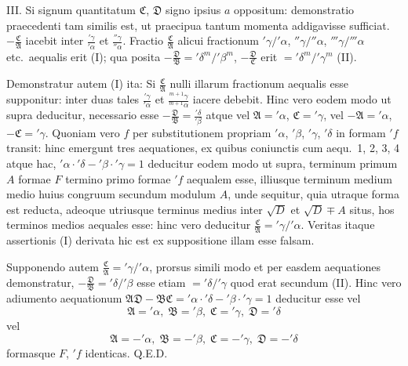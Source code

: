 \documentclass[12pt,a4paper]{article}
\theoremstyle{plain}
\begin{document}
III. Si signum quantitatum $\mathfrak{C}$, $\mathfrak{D}$ signo ipsius $a$ oppositum: demonstratio praecedenti tam similis est, ut praecipua tantum momenta addigavisse sufficiat. $-\frac{\mathfrak{C}}{\mathfrak{A}}$ iacebit inter $\frac{'\gamma}{'\alpha}$ et $\frac{''\gamma}{''\alpha}$. Fractio $\frac{\mathfrak{C}}{\mathfrak{A}}$ alicui fractionum $'\gamma/'\alpha$, $''\gamma/''\alpha$, $'''\gamma/'''\alpha$ etc.~aequalis erit (I); qua posita $-\frac{\mathfrak{D}}{\mathfrak{B}} = '\delta^m/'\beta^m$, $-\frac{\mathfrak{D}}{\mathfrak{C}}$ erit $= '\delta^m/'\gamma^m$ (II).

Demonstratur autem (I) ita: Si $\frac{\mathfrak{C}}{\mathfrak{A}}$ nulli illarum fractionum aequalis esse supponitur: inter duas tales $\frac{'\gamma}{'\alpha}$ et $\frac{^{m+1}\gamma}{^{m+1}\alpha}$ iacere debebit. Hinc vero eodem modo ut supra deducitur, necessario esse $-\frac{\mathfrak{D}}{\mathfrak{B}} = \frac{'\delta}{'\beta}$ atque vel $\mathfrak{A} = '\alpha$, $\mathfrak{C} = '\gamma$, vel $-\mathfrak{A} = '\alpha$, $-\mathfrak{C} = '\gamma$. Quoniam vero $f$ per substitutionem propriam $'\alpha$, $'\beta$, $'\gamma$, $'\delta$ in formam $'f$ transit: hinc emergunt tres aequationes, ex quibus coniunctis cum aequ.~1, 2, 3, 4 atque hac, $'\alpha\cdot'\delta - '\beta\cdot'\gamma = 1$ deducitur eodem modo ut supra, terminum primum $A$ formae $F$ termino primo formae $'f$ aequalem esse, illiusque terminum medium medio huius congruum secundum modulum $A$, unde sequitur, quia utraque forma est reducta, adeoque utriusque terminus medius inter $\sqrt{D}$ et $\sqrt{D} \mp A$ situs, hos terminos medios aequales esse: hinc vero deducitur $\frac{\mathfrak{C}}{\mathfrak{A}} = '\gamma/'\alpha$. Veritas itaque assertionis (I) derivata hic est ex suppositione illam esse falsam.

Supponendo autem $\frac{\mathfrak{C}}{\mathfrak{A}} = '\gamma/'\alpha$, prorsus simili modo et per easdem aequationes demonstratur, $-\frac{\mathfrak{D}}{\mathfrak{B}} = '\delta/'\beta$ esse etiam $= '\delta/'\gamma$ quod erat secundum (II). Hinc vero adiumento aequationum $\mathfrak{A}\mathfrak{D} - \mathfrak{B}\mathfrak{C} = '\alpha\cdot'\delta - '\beta\cdot'\gamma = 1$ deducitur esse vel
\[
\mathfrak{A} = '\alpha, \; \mathfrak{B} = '\beta, \; \mathfrak{C} = '\gamma, \; \mathfrak{D} = '\delta
\]
vel
\[
\mathfrak{A} = -'\alpha, \; \mathfrak{B} = -'\beta, \; \mathfrak{C} = -'\gamma, \; \mathfrak{D} = -'\delta
\]
formasque $F$, $'f$ identicas. \hfill Q.E.D.

\bigskip
\end{document}
